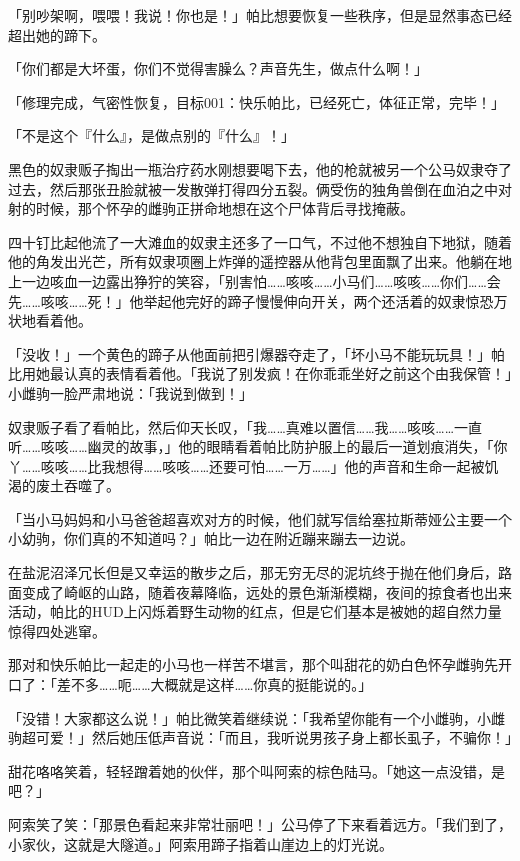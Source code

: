「别吵架啊，喂喂！我说！你也是！」帕比想要恢复一些秩序，但是显然事态已经超出她的蹄下。

「你们都是大坏蛋，你们不觉得害臊么？声音先生，做点什么啊！」

「{\mt 修理完成，气密性恢复，目标001：快乐帕比，已经死亡，体征正常，完毕！}」

「不是这个『什么』，是做点别的『什么』！」

黑色的奴隶贩子掏出一瓶治疗药水刚想要喝下去，他的枪就被另一个公马奴隶夺了过去，然后那张丑脸就被一发散弹打得四分五裂。俩受伤的独角兽倒在血泊之中对射的时候，那个怀孕的雌驹正拼命地想在这个尸体背后寻找掩蔽。

四十钉比起他流了一大滩血的奴隶主还多了一口气，不过他不想独自下地狱，随着他的角发出光芒，所有奴隶项圈上炸弹的遥控器从他背包里面飘了出来。他躺在地上一边咳血一边露出狰狞的笑容，「别害怕……咳咳……小马们……咳咳……你们……会先……咳咳……死！」他举起他完好的蹄子慢慢伸向开关，两个还活着的奴隶惊恐万状地看着他。

「没收！」一个黄色的蹄子从他面前把引爆器夺走了，「坏小马不能玩玩具！」帕比用她最认真的表情看着他。「我说了别发疯！在你乖乖坐好之前这个由我保管！」小雌驹一脸严肃地说：「我说到做到！」

奴隶贩子看了看帕比，然后仰天长叹，「我……真难以置信……我……咳咳……一直听……咳咳……幽灵的故事，」他的眼睛看着帕比防护服上的最后一道划痕消失，「你丫……咳咳……比我想得……咳咳……还要可怕……一万……」他的声音和生命一起被饥渴的废土吞噬了。

\horizonline


「当小马妈妈和小马爸爸超喜欢对方的时候，他们就写信给塞拉斯蒂娅公主要一个小幼驹，你们真的不知道吗？」帕比一边在附近蹦来蹦去一边说。

在盐泥沼泽冗长但是又幸运的散步之后，那无穷无尽的泥坑终于抛在他们身后，路面变成了崎岖的山路，随着夜幕降临，远处的景色渐渐模糊，夜间的掠食者也出来活动，帕比的HUD上闪烁着野生动物的红点，但是它们基本是被她的超自然力量惊得四处逃窜。

那对和快乐帕比一起走的小马也一样苦不堪言，那个叫甜花的奶白色怀孕雌驹先开口了：「差不多……呃……大概就是这样……你真的挺能说的。」

「没错！大家都这么说！」帕比微笑着继续说：「我希望你能有一个小雌驹，小雌驹超可爱！」然后她压低声音说：「而且，我听说男孩子身上都长虱子，不骗你！」

甜花咯咯笑着，轻轻蹭着她的伙伴，那个叫阿索的棕色陆马。「她这一点没错，是吧？」

阿索笑了笑：「那景色看起来非常壮丽吧！」公马停了下来看着远方。「我们到了，小家伙，这就是大隧道。」阿索用蹄子指着山崖边上的灯光说。

